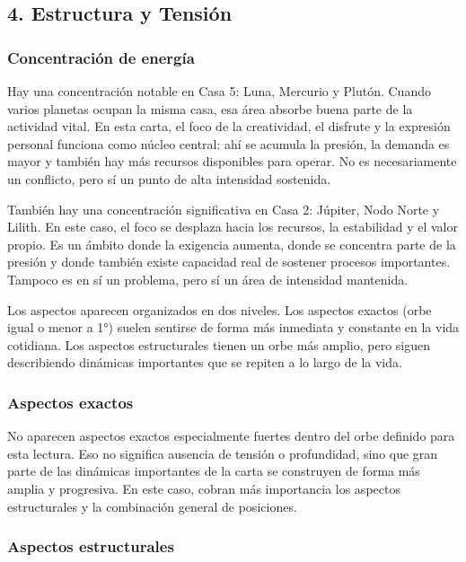 \documentclass[11pt,a4paper]{article}
\begin{document}
\subsection{4. Estructura y Tensión}

\subsubsection*{Concentración de energía}

Hay una concentración notable en Casa 5: Luna, Mercurio y Plutón. Cuando varios planetas ocupan la misma casa, esa área absorbe buena parte de la actividad vital. En esta carta, el foco de la creatividad, el disfrute y la expresión personal funciona como núcleo central: ahí se acumula la presión, la demanda es mayor y también hay más recursos disponibles para operar. No es necesariamente un conflicto, pero sí un punto de alta intensidad sostenida.

También hay una concentración significativa en Casa 2: Júpiter, Nodo Norte y Lilith. En este caso, el foco se desplaza hacia los recursos, la estabilidad y el valor propio. Es un ámbito donde la exigencia aumenta, donde se concentra parte de la presión y donde también existe capacidad real de sostener procesos importantes. Tampoco es en sí un problema, pero sí un área de intensidad mantenida.



Los aspectos aparecen organizados en dos niveles. Los aspectos exactos (orbe igual o menor a 1°) suelen sentirse de forma más inmediata y constante en la vida cotidiana. Los aspectos estructurales tienen un orbe más amplio, pero siguen describiendo dinámicas importantes que se repiten a lo largo de la vida.



\subsubsection*{Aspectos exactos}
No aparecen aspectos exactos especialmente fuertes dentro del orbe definido para esta lectura. Eso no significa ausencia de tensión o profundidad, sino que gran parte de las dinámicas importantes de la carta se construyen de forma más amplia y progresiva. En este caso, cobran más importancia los aspectos estructurales y la combinación general de posiciones.

\subsubsection*{Aspectos estructurales}
\end{document}

